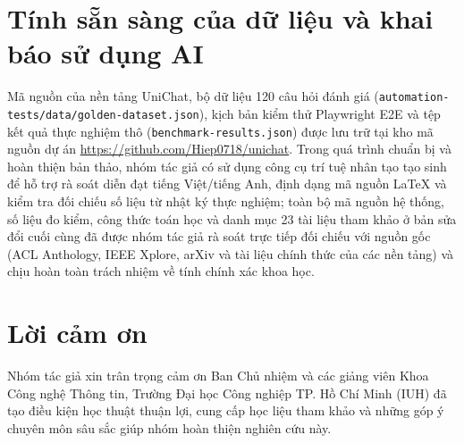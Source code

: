 \documentclass{IEEEtran}
\begin{document}
\section*{Tính sẵn sàng của dữ liệu và khai báo sử dụng AI}
Mã nguồn của nền tảng UniChat, bộ dữ liệu 120 câu hỏi đánh giá (\texttt{automation-tests/data/golden-dataset.json}), kịch bản kiểm thử Playwright E2E và tệp kết quả thực nghiệm thô (\texttt{benchmark-results.json}) được lưu trữ tại kho mã nguồn dự án \url{https://github.com/Hiep0718/unichat}. Trong quá trình chuẩn bị và hoàn thiện bản thảo, nhóm tác giả có sử dụng công cụ trí tuệ nhân tạo tạo sinh để hỗ trợ rà soát diễn đạt tiếng Việt/tiếng Anh, định dạng mã nguồn \LaTeX{} và kiểm tra đối chiếu số liệu từ nhật ký thực nghiệm; toàn bộ mã nguồn hệ thống, số liệu đo kiểm, công thức toán học và danh mục 23 tài liệu tham khảo ở bản sửa đổi cuối cùng đã được nhóm tác giả rà soát trực tiếp đối chiếu với nguồn gốc (ACL Anthology, IEEE Xplore, arXiv và tài liệu chính thức của các nền tảng) và chịu hoàn toàn trách nhiệm về tính chính xác khoa học.

\section*{Lời cảm ơn}
Nhóm tác giả xin trân trọng cảm ơn Ban Chủ nhiệm và các giảng viên Khoa Công nghệ Thông tin, Trường Đại học Công nghiệp TP. Hồ Chí Minh (IUH) đã tạo điều kiện học thuật thuận lợi, cung cấp học liệu tham khảo và những góp ý chuyên môn sâu sắc giúp nhóm hoàn thiện nghiên cứu này.
\end{document}
